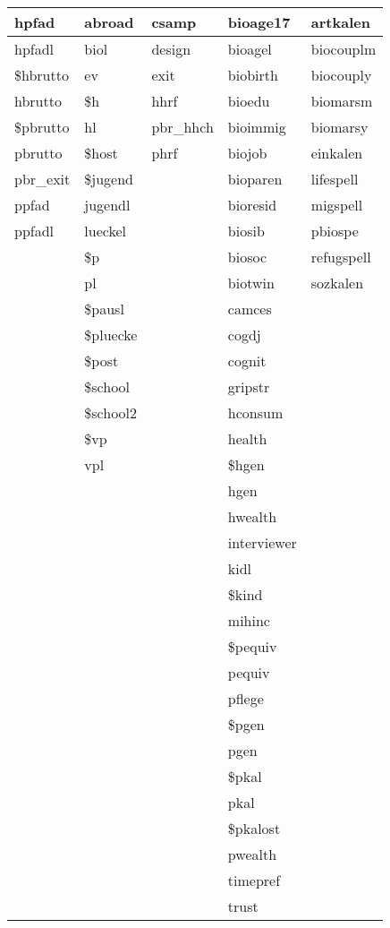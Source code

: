 \documentclass[letterpaper,10pt,openany,onesideH,english]{sphinxmanual}
\begin{document}
\begin{savenotes}
\begin{longtable}{|l|l|l|l|l|}
hpfad
&
abroad
&
csamp
&
bioage17
&
artkalen
\\
\hline
hpfadl
&
biol
&
design
&
bioagel
&
biocouplm
\\
\hline
\$hbrutto
&
ev
&
exit
&
biobirth
&
biocouply
\\
\hline
hbrutto
&
\$h
&
hhrf
&
bioedu
&
biomarsm
\\
\hline
\$pbrutto
&
hl
&
pbr\_hhch
&
bioimmig
&
biomarsy
\\
\hline
pbrutto
&
\$host
&
phrf
&
biojob
&
einkalen
\\
\hline
pbr\_exit
&
\$jugend
&&
bioparen
&
lifespell
\\
\hline
ppfad
&
jugendl
&&
bioresid
&
migspell
\\
\hline
ppfadl
&
lueckel
&&
biosib
&
pbiospe
\\
\hline&
\$p
&&
biosoc
&
refugspell
\\
\hline&
pl
&&
biotwin
&
sozkalen
\\
\hline&
\$pausl
&&
camces
&\\
\hline&
\$pluecke
&&
cogdj
&\\
\hline&
\$post
&&
cognit
&\\
\hline&
\$school
&&
gripstr
&\\
\hline&
\$school2
&&
hconsum
&\\
\hline&
\$vp
&&
health
&\\
\hline&
vpl
&&
\$hgen
&\\
\hline&&&
hgen
&\\
\hline&&&
hwealth
&\\
\hline&&&
interviewer
&\\
\hline&&&
kidl
&\\
\hline&&&
\$kind
&\\
\hline&&&
mihinc
&\\
\hline&&&
\$pequiv
&\\
\hline&&&
pequiv
&\\
\hline&&&
pflege
&\\
\hline&&&
\$pgen
&\\
\hline&&&
pgen
&\\
\hline&&&
\$pkal
&\\
\hline&&&
pkal
&\\
\hline&&&
\$pkalost
&\\
\hline&&&
pwealth
&\\
\hline&&&
timepref
&\\
\hline&&&
trust
&\\
\hline
\end{longtable}\sphinxatlongtableend\end{savenotes}
\end{document}
